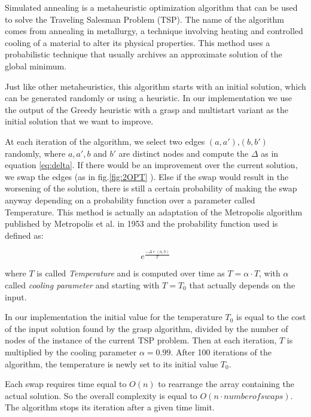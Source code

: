 Simulated annealing is a metaheuristic optimization algorithm that can be used to solve the Traveling Salesman Problem (TSP).
The name of the algorithm comes from annealing in metallurgy, a technique involving heating and controlled cooling of a material to alter its physical properties. This method uses a probabilistic technique that usually archives an approximate solution of the global minimum.

Just like other metaheuristics, this algorithm starts with an initial solution, which can be generated randomly or using a heuristic. In our implementation we use the output of the Greedy heuristic with a grasp and multistart variant as the initial solution that we want to improve.

At each iteration of the algorithm, we select two edges $(a,a')$,$(b,b')$ randomly, where $a,a',b$ and $b'$ are distinct nodes and compute the $\Delta$ as in equation \ref{eq:delta}. If there would be an improvement over the current solution, we swap the edges (as in fig.\ref{fig:2OPT} ). Else if the swap would result in the worsening of the solution, there is still a certain probability of making the swap anyway depending on a probability function over a parameter called Temperature. This method is actually an adaptation of the Metropolis algorithm published by Metropolis et al. in 1953 and the probability function used is defined as:

\begin{equation*}
    e^{\frac{-\Delta \operatorname{c}(a,b)}{T}}
\end{equation*}

where $T$ is called \textit{Temperature} and is computed over time as $T = \alpha \cdot T$, with $\alpha$ called \textit{cooling parameter} and starting with $T = T_0$ that actually depends on the input.

In our implementation the initial value for the temperature $T_0$ is equal to the cost of the input solution found by the grasp algorithm, divided by the number of nodes of the instance of the current TSP problem. Then at each iteration, $T$ is multiplied by the cooling parameter $\alpha = 0.99$. After 100 iterations of the algorithm, the temperature is newly set to its initial value $T_0$.

Each swap requires time equal to $O(n)$ to rearrange the array containing the actual solution. So the overall complexity is equal to $O(n \cdot number of swaps)$.
The algorithm stops its iteration after a given time limit.

